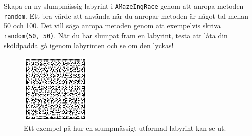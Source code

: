 \Subtask Skapa en ny slumpmässig labyrint i \texttt{AMazeIngRace} genom att anropa metoden \texttt{random}. Ett bra värde att använda när du anropar metoden är något tal mellan 50 och 100. Det vill säga anropa metoden genom att exempelvis skriva \texttt{random(50, 50)}. När du har slumpat fram en labyrint, testa att låta din sköldpadda gå igenom labyrinten och se om den lyckas!

\begin{figure}[h]
	\begin{center}
		\includegraphics[width=0.3\textwidth]{../img/w09-lab/RandomMaze.jpg}
	\end{center}
	\caption{Ett exempel på hur en slumpmässigt utformad labyrint kan se ut.}
\end{figure}

